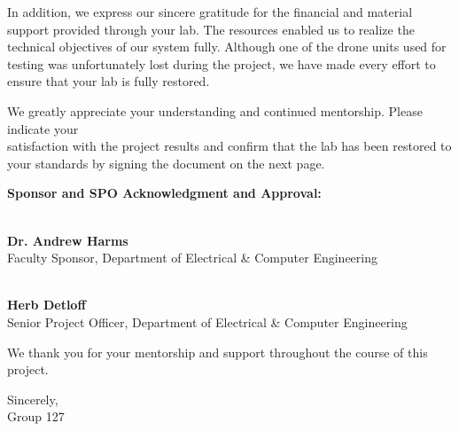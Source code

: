 \documentclass[11pt]{letter}
\begin{document}
In addition, we express our sincere gratitude for the financial and material support provided through your lab. The resources enabled us to realize the technical objectives of our system fully. Although one of the drone units used for testing was unfortunately lost during the project, we have made every effort to ensure that your lab is fully restored.

We greatly appreciate your understanding and continued mentorship. Please indicate your \\
satisfaction with the project results and confirm that the lab has been restored to your standards by signing the document on the next page.

\newpage

\noindent\textbf{Sponsor and SPO Acknowledgment and Approval:}

\vspace{2em}

\noindent\makebox[2.5in]{\hrulefill} \\
\textbf{Dr. Andrew Harms} \\
Faculty Sponsor, Department of Electrical \& Computer Engineering

\vspace{2em}

\noindent\makebox[2.5in]{\hrulefill} \\
\textbf{Herb Detloff} \\
Senior Project Officer, Department of Electrical \& Computer Engineering \\
\vspace{0.5em}

\noindent We thank you for your mentorship and support throughout the course of this project.

\vspace{0.5em}

\noindent Sincerely, \\
Group 127
\end{document}

